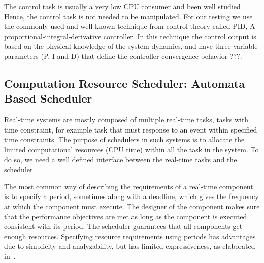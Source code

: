 \documentclass[ twoside, 12pt ]{article}
\newcommand{\commentOut}[1]{}
\begin{document}
{%
The control task is usually a very low CPU consumer and been well studied~\cite{Bennett,Cervin}. Hence, the control task is not needed to be manipulated.
For our testing we use the commonly used and well known technique from control theory called PID, A proportional-integral-derivative controller.
In this technique the control output is based on the physical knowledge of the system dynamics, and have three variable parameters (P, I and D) that define the controller convergence behavior \cite{PID} ???.

\commentOut{
    We also plan to try to use an ``adjustable'' LQR (Linear-quadratic regulator) control, as follows.
    LQR is an optimal controller that take into account the level of certainty of the state estimation. 
    Is usually a hard task to know the certainty of estimation, but in our case we need to calculate it anyway, and we mark it as $var(x-\tilde{x})$.
    We will make LQR ``adjustable'' in the sense that each iteration the controller will consider the new (variable) $var(x-\tilde{x})$. This is similar to the architecture we proposed for the estimator.
    We will check if adjustable LQR has significant advantages over PID in cases were we have variable certainty of estimation.
}

\subsection{Computation Resource Scheduler: Automata Based Scheduler}
\label{sec:scheduler}

Real-time systems are mostly composed of multiple real-time tasks, tasks with time constraint, for example task that must response to an event within specified time constraints.
The purpose of schedulers in such systems is to allocate the limited computational resources (CPU time) within all the task in the system. To do so, we need a well defined interface between the real-time tasks and the scheduler.

The most common way of describing the requirements of a real-time component is to specify a period, sometimes along with a deadline, which gives the frequency at which the component must execute. 
The designer of the component makes sure that the performance objectives are met as long as the component is executed consistent with its period. The scheduler guarantees that all components get enough resources.
Specifying resource requirements using periods has advantages due to simplicity and analyzability, but has limited expressiveness, as elaborated in~\cite{RTComposer}. 





}
\end{document}
